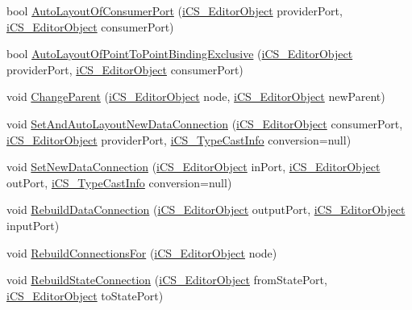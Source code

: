 \begin{DoxyCompactItemize}
\item 
bool \hyperlink{classi_c_s___i_storage_a286225201b55817baf826c741b3c8df2}{Auto\+Layout\+Of\+Consumer\+Port} (\hyperlink{classi_c_s___editor_object}{i\+C\+S\+\_\+\+Editor\+Object} provider\+Port, \hyperlink{classi_c_s___editor_object}{i\+C\+S\+\_\+\+Editor\+Object} consumer\+Port)
\item 
bool \hyperlink{classi_c_s___i_storage_ae1b2a3824fc3118328c26efcc30d3fc1}{Auto\+Layout\+Of\+Point\+To\+Point\+Binding\+Exclusive} (\hyperlink{classi_c_s___editor_object}{i\+C\+S\+\_\+\+Editor\+Object} provider\+Port, \hyperlink{classi_c_s___editor_object}{i\+C\+S\+\_\+\+Editor\+Object} consumer\+Port)
\item 
void \hyperlink{classi_c_s___i_storage_a44288b9130c42a798ee8a656c8b99c60}{Change\+Parent} (\hyperlink{classi_c_s___editor_object}{i\+C\+S\+\_\+\+Editor\+Object} node, \hyperlink{classi_c_s___editor_object}{i\+C\+S\+\_\+\+Editor\+Object} new\+Parent)
\item 
void \hyperlink{classi_c_s___i_storage_a7d60f8ed5c629cccb3e832d10e3622f7}{Set\+And\+Auto\+Layout\+New\+Data\+Connection} (\hyperlink{classi_c_s___editor_object}{i\+C\+S\+\_\+\+Editor\+Object} consumer\+Port, \hyperlink{classi_c_s___editor_object}{i\+C\+S\+\_\+\+Editor\+Object} provider\+Port, \hyperlink{classi_c_s___type_cast_info}{i\+C\+S\+\_\+\+Type\+Cast\+Info} conversion=null)
\item 
void \hyperlink{classi_c_s___i_storage_aec877dca859edef9d63e0398c4778780}{Set\+New\+Data\+Connection} (\hyperlink{classi_c_s___editor_object}{i\+C\+S\+\_\+\+Editor\+Object} in\+Port, \hyperlink{classi_c_s___editor_object}{i\+C\+S\+\_\+\+Editor\+Object} out\+Port, \hyperlink{classi_c_s___type_cast_info}{i\+C\+S\+\_\+\+Type\+Cast\+Info} conversion=null)
\item 
void \hyperlink{classi_c_s___i_storage_a4a02f72c3b121b909e931ce146dc7290}{Rebuild\+Data\+Connection} (\hyperlink{classi_c_s___editor_object}{i\+C\+S\+\_\+\+Editor\+Object} output\+Port, \hyperlink{classi_c_s___editor_object}{i\+C\+S\+\_\+\+Editor\+Object} input\+Port)
\item 
void \hyperlink{classi_c_s___i_storage_ad9554c1880b97960e513ab8b62c602dd}{Rebuild\+Connections\+For} (\hyperlink{classi_c_s___editor_object}{i\+C\+S\+\_\+\+Editor\+Object} node)
\item 
void \hyperlink{classi_c_s___i_storage_a5c12f1e17c43677e85bc8c4d5238c02e}{Rebuild\+State\+Connection} (\hyperlink{classi_c_s___editor_object}{i\+C\+S\+\_\+\+Editor\+Object} from\+State\+Port, \hyperlink{classi_c_s___editor_object}{i\+C\+S\+\_\+\+Editor\+Object} to\+State\+Port)

\end{DoxyCompactItemize}
